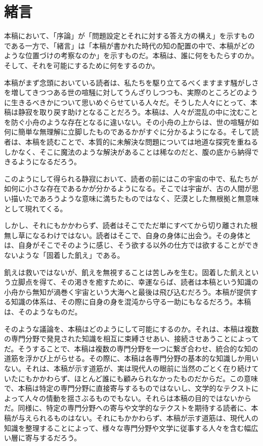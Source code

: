 \section{緒言}\label{ux7dd2ux8a00}

本稿において、「序論」が「問題設定とそれに対する答え方の構え」を示すものである一方で、「緒言」は「本稿が書かれた時代の知の配置の中で、本稿がどのような位置づけの考察なのか」を示すものだ。本稿は、誰に何をもたらすのか。そして、それを可能にするために何をするのか。

本稿がまず念頭においている読者は、私たちを駆り立てるべくますます騒がしさを増してきつつある世の喧騒に対してうんざりしつつも、実際のところどのように生きるべきかについて思いめぐらせている人々だ。そうした人々にとって、本稿は静寂を取り戻す助けとなることだろう。本稿は、人々が混乱の中に沈むことを防ぐ小舟のような存在となるに違いない。その小舟の上からは、世の喧騒が如何に簡単な無理解に立脚したものであるかがすぐに分かるようになる。そして読者は、本稿を読むことで、本質的に未解決な問題については地道な探究を重ねるしかなく、そこに魔法のような解決があることは稀なのだと、腹の底から納得できるようになるだろう。

このようにして得られる静寂において、読者の前にはこの宇宙の中で、私たちが如何に小さな存在であるかが分かるようになる。そこでは宇宙が、古の人間が思い描いたであろうような意味に満ちたものではなく、茫漠とした無根拠と無意味として現れてくる。

しかし、それにもかかわらず、読者はそこでただ単にすべてから切り離された根無し草になるわけではない。読者はそこで、自身の身体に出会う。その身体とは、自身がそこでそのように感じ、そう欲する以外の仕方では欲することができないような「固着した飢え」である。

飢えは救いではないが、飢えを無視することは苦しみを生む。固着した飢えという立脚点を得て、その渇きを癒すために、幸運ならば、読者は本稿という知識の小舟から無知が渦巻く宇宙という大海へと最後は飛び込むだろう。本稿が提供する知識の体系は、その際に自身の身を混沌から守る一助にもなるだろう。本稿は、そのようなものだ。

そのような議論を、本稿はどのようにして可能にするのか。それは、本稿は複数の専門分野で発見された知識を相互に束縛させあい、接続させあうことによってだ。そうすることで、本稿は複数の専門分野を一つに繋ぎ合わせ、統合的な知の道筋を浮かび上がらせる。その際に、本稿は各専門分野の基本的な知識しか用いない。それは、本稿が示す道筋が、実は現代人の眼前に当然のごとく在り続けていたにもかかわらず、ほとんど誰にも顧みられなかったものだからだ。この意味で、本稿は特定の専門分野に直接寄与するものではないし、文学的なテクストによって人々の情動を揺さぶるものでもない。それらは本稿の目的ではないからだ。同様に、特定の専門分野への寄与や文学的なテクストを期待する読者に、本稿が与えられるものはない。それにもかかわらず、本稿が示す道筋は、現代人の知識を整理することによって、様々な専門分野や文学に従事する人々を含む幅広い層に寄与するだろう。
